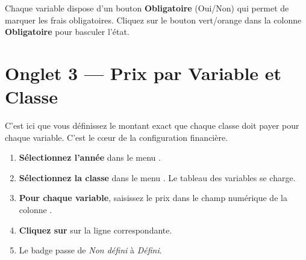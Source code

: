 \begin{info}
Chaque variable dispose d'un bouton \textbf{Obligatoire} (Oui/Non) qui permet de marquer les frais obligatoires. Cliquez sur le bouton vert/orange dans la colonne \textbf{Obligatoire} pour basculer l'\'etat.
\end{info}

\section{Onglet 3 --- Prix par Variable et Classe}

C'est ici que vous d\'efinissez le montant exact que chaque classe doit payer pour chaque variable. C'est le c\oe ur de la configuration financi\`ere.

\begin{etape}[title=Proc\'edure d\'etaill\'ee : D\'efinir les prix]
\begin{enumerate}[leftmargin=1.5cm,label=\textbf{\arabic*.},itemsep=12pt]
  \item \textbf{S\'electionnez l'ann\'ee} dans le menu .
  \item \textbf{S\'electionnez la classe} dans le menu . Le tableau des variables se charge.
  \item \textbf{Pour chaque variable}, saisissez le prix dans le champ num\'erique de la colonne .
  \item \textbf{Cliquez sur}  sur la ligne correspondante.
  \item Le badge passe de \textcolor{amber}{\textit{Non d\'efini}} \`a \textcolor{emerald}{\textit{D\'efini}}.
\end{enumerate}
\end{etape}

